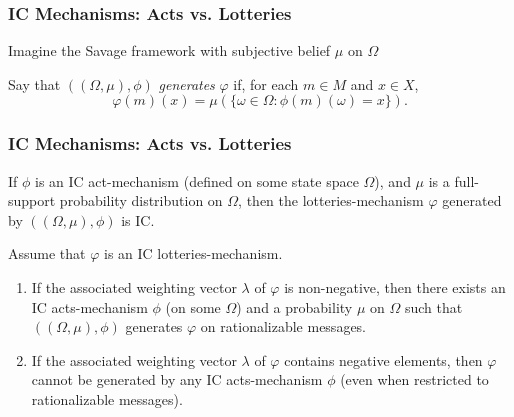 
\begin{frame}
  \frametitle{IC Mechanisms: Acts vs. Lotteries}

Imagine the Savage framework with subjective belief $\mu$ on $\Omega$

\begin{definition}
Say that $((\Omega ,\mu), \phi)$ \emph{generates} $\varphi$ if, for each $m\in M$ and $x\in X$,
$$\varphi(m)(x) = \mu\left(\{\omega\in\Omega: \phi(m)(\omega)=x\}\right).$$
\end{definition}

\end{frame}




\begin{frame}
  \frametitle{IC Mechanisms: Acts vs. Lotteries}

\begin{proposition}
If $\phi$ is an IC act-mechanism (defined on some state space $\Omega$), and $\mu$ is a full-support probability distribution on $\Omega$, then the lotteries-mechanism $\varphi$ generated by $((\Omega ,\mu), \phi)$ is IC.
\end{proposition}

\begin{proposition}
Assume that $\varphi$ is an IC lotteries-mechanism.
\begin{enumerate}
\item If the associated weighting vector $\lambda$ of $\varphi$ is non-negative, then there exists an IC acts-mechanism $\phi$ (on some $\Omega$) and a probability $\mu$ on $\Omega$ such that $((\Omega, \mu), \phi)$ generates $\varphi$ on rationalizable messages.

\item If the associated weighting vector $\lambda$ of $\varphi$ contains negative elements, then $\varphi$ cannot be generated by any IC acts-mechanism $\phi$ (even when restricted to rationalizable messages).
\end{enumerate}
\end{proposition}


\end{frame}

